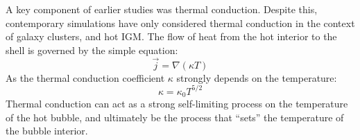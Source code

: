 \documentclass[extrafontsizes, 30pt]{memoir}
\begin{document}
\color{white}
A key component of earlier studies was
thermal conduction.  Despite this, contemporary simulations have only considered
thermal conduction in the context of galaxy clusters, and hot IGM.
The flow of heat from the hot interior to the shell is
governed by the simple equation:
$$\vec j = \nabla (\kappa T)$$
As the thermal conduction coefficient $\kappa$ strongly depends on the
temperature:
$$\kappa = \kappa_0 T^{5/2}$$
Thermal conduction can act as a strong self-limiting process on the temperature
of the hot bubble, and ultimately be the process that ``sets'' the temperature
of the bubble interior.
\end{document}
